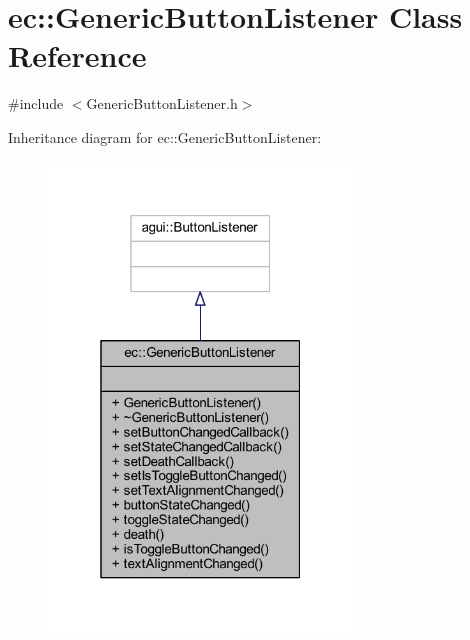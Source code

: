 \hypertarget{classec_1_1_generic_button_listener}{}\section{ec\+:\+:Generic\+Button\+Listener Class Reference}
\label{classec_1_1_generic_button_listener}


{\ttfamily \#include $<$Generic\+Button\+Listener.\+h$>$}



Inheritance diagram for ec\+:\+:Generic\+Button\+Listener\+:\nopagebreak
\begin{figure}[H]
\begin{center}
\leavevmode
\includegraphics[width=229pt]{classec_1_1_generic_button_listener__inherit__graph}
\end{center}
\end{figure}


